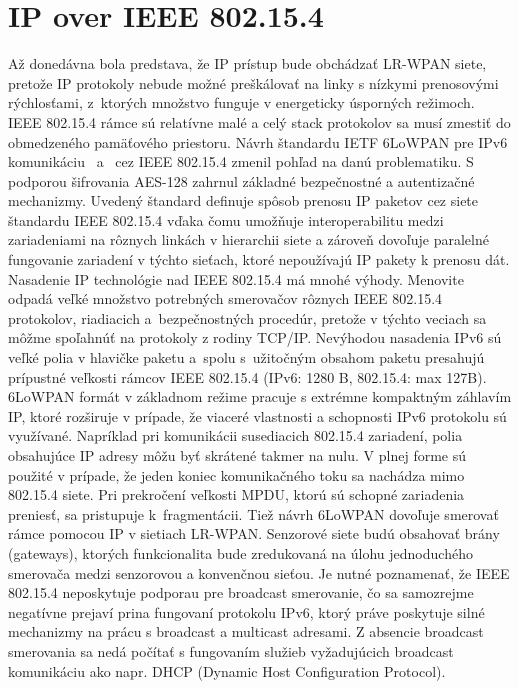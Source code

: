 \section{IP over IEEE 802.15.4}
\indent\indent Až donedávna bola predstava, že IP prístup bude obchádzať LR-WPAN siete, pretože IP protokoly nebude možné preškálovať na linky s nízkymi prenosovými rýchlosťami, z~ktorých množstvo funguje v energeticky úsporných režimoch. IEEE 802.15.4 rámce sú relatívne malé a celý stack protokolov sa musí zmestiť do obmedzeného pamäťového priestoru. Návrh štandardu IETF 6LoWPAN pre IPv6 komunikáciu~\cite{rfc_4919} a~\cite{rfc_4944} cez IEEE 802.15.4 zmenil pohľad na danú problematiku. S podporou šifrovania AES-128 zahrnul základné bezpečnostné a autentizačné mechanizmy. Uvedený štandard definuje spôsob prenosu IP paketov cez siete štandardu IEEE 802.15.4 vďaka čomu umožňuje interoperabilitu medzi zariadeniami na rôznych linkách v hierarchii siete a zároveň dovoľuje paralelné fungovanie zariadení v týchto sieťach, ktoré nepoužívajú IP pakety k prenosu dát.\\
\indent Nasadenie IP technológie nad IEEE 802.15.4 má mnohé výhody. Menovite odpadá veľké množstvo potrebných smerovačov rôznych IEEE 802.15.4 protokolov, riadiacich a~bezpečnostných procedúr, pretože v týchto veciach sa môžme spoľahnúť na protokoly z rodiny TCP/IP. Nevýhodou nasadenia IPv6 sú veľké polia v hlavičke paketu a~spolu s~užitočným obsahom paketu presahujú prípustné veľkosti rámcov IEEE 802.15.4 (IPv6: 1280 B, 802.15.4: max 127B). 6LoWPAN formát v základnom režime pracuje s extrémne kompaktným záhlavím IP, ktoré rozširuje v prípade, že viaceré vlastnosti a schopnosti IPv6 protokolu sú využívané. Napríklad pri komunikácii susediacich 802.15.4 zariadení, polia obsahujúce IP adresy môžu byť skrátené takmer na nulu. V plnej forme sú použité v prípade, že jeden koniec komunikačného toku sa nachádza mimo 802.15.4 siete. Pri prekročení veľkosti MPDU, ktorú sú schopné zariadenia preniesť, sa pristupuje k~fragmentácii. Tiež návrh 6LoWPAN dovoľuje smerovať rámce pomocou IP v sietiach LR-WPAN. Senzorové siete budú obsahovať brány (gateways), ktorých funkcionalita bude zredukovaná na úlohu jednoduchého smerovača medzi senzorovou a konvenčnou sieťou. Je nutné poznamenať, že IEEE 802.15.4 neposkytuje podporau pre broadcast smerovanie, čo sa samozrejme negatívne prejaví prina fungovaní protokolu IPv6, ktorý práve poskytuje silné mechanizmy na prácu s broadcast a multicast adresami. Z absencie broadcast smerovania sa nedá počítať s fungovaním služieb vyžadujúcich broadcast komunikáciu ako napr. DHCP (Dynamic Host Configuration Protocol).\\
